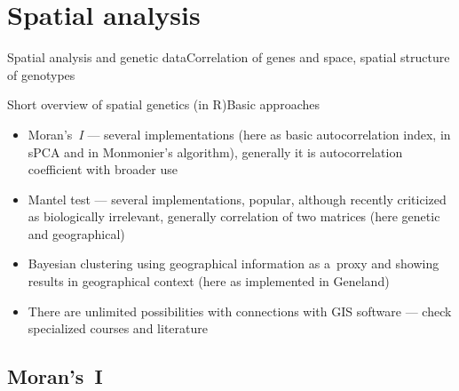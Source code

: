 \documentclass[compress, ucs, xelatex, 11pt, xcolor=svgnames,
  hyperref={
    bookmarks=true,
    unicode=true,
    colorlinks=true,
    pdftitle={Molecular data in R},
    plainpages=false,
    pdfauthor={Vojtech Zeisek},
    pdfsubject={Course about phylogeny and evolution in R},
    pdfcreator={XeLaTeX},
    pdfkeywords={R, evolution, phylogeny, molecular data},
    linkcolor=Tomato,
    anchorcolor=SaddleBrown,
    citecolor=Goldenrod,
    filecolor=DarkMagenta,
    menucolor=Sienna,
    urlcolor=DarkTurquoise,
    pdftex},
  url={hyphens, lowtilde} %
  ]{beamer}
\begin{document}
\section{Spatial analysis}

\begin{frame}{Spatial analysis and genetic data}{Correlation of genes and space, spatial structure of genotypes}
  \tableofcontents[currentsection, sectionstyle=show/hide, hideothersubsections]
\end{frame}

\begin{frame}{Short overview of spatial genetics (in R)}{Basic approaches}
  \begin{itemize}
    \item Moran's~\textit{I} --- several implementations (here as basic autocorrelation index, in sPCA and in Monmonier's algorithm), generally it is autocorrelation coefficient with broader use
    \item Mantel test --- several implementations, popular, although recently criticized as biologically irrelevant, generally correlation of two matrices (here genetic and geographical)
    \item Bayesian clustering using geographical information as a~proxy and showing results in geographical context (here as implemented in Geneland)
    \item There are unlimited possibilities with connections with GIS software --- check specialized courses and literature
  \end{itemize}
\end{frame}

\subsection{Moran's~I}
\end{document}
